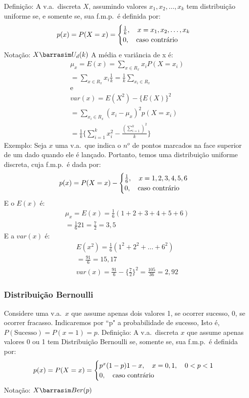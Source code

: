 \documentclass[11pt,a4paper]{article}
\begin{document}
Definição: A v.a.\ discreta $X$, assumindo valores $x_1,x_2,\dots,x_k$ tem 
distribuição uniforme se, e somente se, sua f.m.p.\ é definida por: 
\begin{align}
  p(x)=P(X=x)=\begin{cases}
    \frac{1}{k}, \text{\quad} x=x_1,x_2,\dots,x_k\\
    0, \text{\quad caso contrário}
  \end{cases}
\end{align}
Notação: $X \barrasim U_{d}(k)$
A média e variância de x é:
\begin{align}
  \mu_{x}=E(x)=\sum_{x \in R_{x}}x_i P(X=x_i)\\
  = \sum_{x \in R_{x}}x_i \frac{1}{k}= \frac{1}{k}\sum_{x_i \in R_{x}}\\
  \text{e}\\
  var(x)=E(X^2)-\{E(X)\}^2\\
  = \sum_{x_i \in R_{x}}(x_i -\mu_x )^2 p(X=x_i)\\
  =\frac{1}{k} \{\sum^k_{i=1} x_i^2 - \frac{(\sum_{i=1}^k)^2}{k}\}
\end{align}
Exemplo: Seja $x$ uma v.a.\ que indica o $n^o$ de pontos marcados na face 
superior de um dado quando ele é lançado. Portanto, temos uma distribuição 
uniforme discreta, cuja f.m.p.\ é dada por: 
\begin{align}
  p(x)=P(X=x)-\begin{cases}
    \frac{1}{6},\text{\quad} x=1,2,3,4,5,6\\
    0, \text{\quad caso contrário}
  \end{cases}
\end{align}
E o $E(x)$ é: 
\begin{align}
  \mu_{x}=E(x)=\frac{1}{6}(1+2+3+4+5+6)\\
  =\frac{1}{6}21= \frac{7}{2}=3,5
\end{align}
E a $var(x)$ é:
\begin{align}
  E(x^2)=\frac{1}{6}(1^2 + 2^2 + \dots + 6^2)\\
  =\frac{91}{6}=15,17\\
  var(x)=\frac{91}{6}- \{\frac{7}{2}\}^2=\frac{105}{36}=2,92
\end{align}
\subsubsection{Distribuição Bernoulli}
Considere uma v.a.\ $x$ que assume apenas dois valores 1, se ocorrer sucesso,
0, se ocorrer fracasso. Indicaremos por ``p" a probabilidade de sucesso, Isto
é, $P(\text{Sucesso})=P(x=1)=p$.
Definição: A v.a.\ discreta $x$ que assume apenas valores 0 ou 1 tem Distribuição
Bernoulli se, somente se, sua f.m.p.\ é definida por:
\begin{align}
  p(x)=P(X=x)= \begin{cases}
    p^{x}(1-p){1-x}, \text{\quad} x=0,1, \text{\quad} 0<p<1\\
    0, \text{\quad caso contrário}
  \end{cases}
\end{align}
Notação: $X \barrasim Ber(p)$
\end{document}
